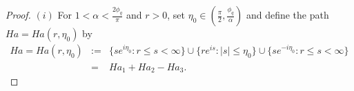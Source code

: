 \documentclass[12pt,reqno]{amsart}
\begin{document}
\begin{proof}
	\noindent $(i)$ For $1<\alpha<\frac{2\phi_q}{\pi}$ and $r>0$, set $\eta_0\in\left(\frac{\pi}{2} , \frac{\phi_q}{\alpha}\right)$ and define the path $Ha=Ha(r,\eta_0)$  by
	\begin{eqnarray}\label{Hankel}
		Ha=Ha(r,\eta_0)&:=& \{se^{i\eta_0}:r\leq s< \infty\}\cup\{re^{is}:|s|\leq \eta_0\}\cup \{se^{-i\eta_0}:r\leq s<\infty\}\nonumber\\
		& = & Ha_1+Ha_2-Ha_3.
	\end{eqnarray} 
	
			
				

\end{proof}
\end{document}
